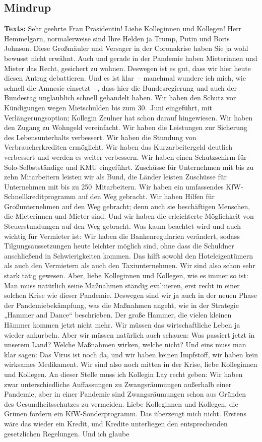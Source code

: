 \documentclass{article}
\begin{document}
\subsection{Mindrup}
\noindent\textbf{Texts:} Sehr geehrte Frau Präsidentin! Liebe Kolleginnen und Kollegen! Herr Hemmelgarn, normalerweise sind Ihre Helden ja Trump, Putin und Boris Johnson.  Diese Großmäuler und Versager in der Coronakrise haben Sie ja wohl bewusst nicht erwähnt.  Auch und gerade in der Pandemie haben Mieterinnen und Mieter das Recht, gesichert zu wohnen. Deswegen ist es gut, dass wir hier heute diesen Antrag debattieren. Und es ist klar – manchmal wundere ich mich, wie schnell die Amnesie einsetzt –, dass hier die Bundesregierung und auch der Bundestag unglaublich schnell gehandelt haben.  Wir haben den Schutz vor Kündigungen wegen Mietschulden bis zum 30. Juni eingeführt, mit Verlängerungsoption; Kollegin Zeulner hat schon darauf hingewiesen. Wir haben den Zugang zu Wohngeld vereinfacht. Wir haben die Leistungen zur Sicherung des Lebensunterhalts verbessert. Wir haben die Stundung von Verbraucherkrediten ermöglicht. Wir haben das Kurzarbeitergeld deutlich verbessert und werden es weiter verbessern.  Wir haben einen Schutzschirm für Solo-Selbstständige und KMU eingeführt. Zuschüsse für Unternehmen mit bis zu zehn Mitarbeitern leisten wir als Bund, die Länder leisten Zuschüsse für Unternehmen mit bis zu 250 Mitarbeitern. Wir haben ein umfassendes KfW-Schnellkreditprogramm auf den Weg gebracht. Wir haben Hilfen für Großunternehmen auf den Weg gebracht; denn auch sie beschäftigen Menschen, die Mieterinnen und Mieter sind. Und wir haben die erleichterte Möglichkeit von Steuerstundungen auf den Weg gebracht. Was kaum beachtet wird und auch wichtig für Vermieter ist: Wir haben die Bankenregularien verändert, sodass Tilgungsaussetzungen heute leichter möglich sind, ohne dass die Schuldner anschließend in Schwierigkeiten kommen. Das hilft sowohl den Hoteleigentümern als auch den Vermietern als auch den Taxiunternehmen. Wir sind also schon sehr stark tätig gewesen.  Aber, liebe Kolleginnen und Kollegen, wie es immer so ist: Man muss natürlich seine Maßnahmen ständig evaluieren, erst recht in einer solchen Krise wie dieser Pandemie. Deswegen sind wir ja auch in der neuen Phase der Pandemiebekämpfung, was die Maßnahmen angeht, wie in der Strategie „Hammer and Dance“ beschrieben. Der große Hammer, die vielen kleinen Hämmer kommen jetzt nicht mehr. Wir müssen das wirtschaftliche Leben ja wieder ankurbeln. Aber wir müssen natürlich auch schauen: Was passiert jetzt in unserem Land? Welche Maßnahmen wirken, welche nicht? Und eins muss man klar sagen: Das Virus ist noch da, und wir haben keinen Impfstoff, wir haben kein wirksames Medikament. Wir sind also noch mitten in der Krise, liebe Kolleginnen und Kollegen.  An dieser Stelle muss ich Kollegin Lay recht geben: Wir haben zwar unterschiedliche Auffassungen zu Zwangsräumungen außerhalb einer Pandemie, aber in einer Pandemie sind Zwangsräumungen schon aus Gründen des Gesundheitsschutzes zu vermeiden.  Liebe Kolleginnen und Kollegen, die Grünen fordern ein KfW-Sonderprogramm. Das überzeugt mich nicht. Erstens wäre das wieder ein Kredit, und Kredite unterliegen den entsprechenden gesetzlichen Regelungen. Und ich glaube 
\end{document}

